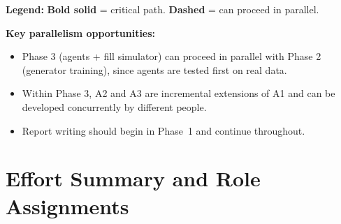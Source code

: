 \documentclass[11pt,a4paper]{article}
\begin{document}
\vspace{0.3cm}
\textbf{Legend:} \textcolor{critical}{\textbf{Bold solid}} = critical path. \textcolor{deepening}{\textbf{Dashed}} = can proceed in parallel.

\vspace{0.5cm}
\noindent\textbf{Key parallelism opportunities:}
\begin{itemize}[nosep]
  \item Phase 3 (agents + fill simulator) can proceed in parallel with Phase 2 (generator training), since agents are tested first on real data.
  \item Within Phase 3, A2 and A3 are incremental extensions of A1 and can be developed concurrently by different people.
  \item Report writing should begin in Phase~1 and continue throughout.
\end{itemize}

\newpage
\section*{Effort Summary and Role Assignments}
\end{document}
